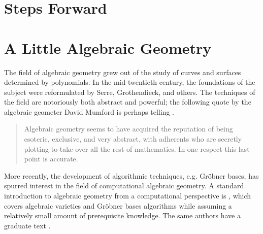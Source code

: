 \documentclass[11pt,titlepage]{article}
\numberwithin{equation}{section}
\begin{document}
\section{Steps Forward}

\appendix

\section{A Little Algebraic Geometry}

    The field of algebraic geometry grew out of the study of curves and surfaces
    determined by polynomials.  In the mid-twentieth century, the foundations of
    the subject were reformulated by Serre, Grothendieck, and others.  The
    techniques of the field are notoriously both abstract and powerful; the
    following quote by the algebraic geometer David Mumford is perhaps telling
    \cite{Mum99}.
    \begin{quote}
        Algebraic geometry seems to have acquired the reputation of being
        esoteric, exclusive, and very abstract, with adherents who are secretly
        plotting to take over all the rest of mathematics.  In one respect this
        last point is accurate.
    \end{quote}
    More recently, the development of algorithmic techniques, e.g. Gröbner
    bases, has spurred interest in the field of computational algebraic
    geometry.  A standard introduction to algebraic geometry from a
    computational perspective is \cite{CLO97}, which covers algebraic varieties
    and Gröbner bases algorithms while assuming a relatively small amount of
    prerequisite knowledge.  The same authors have a graduate text \cite{CLO05}.
\end{document}
